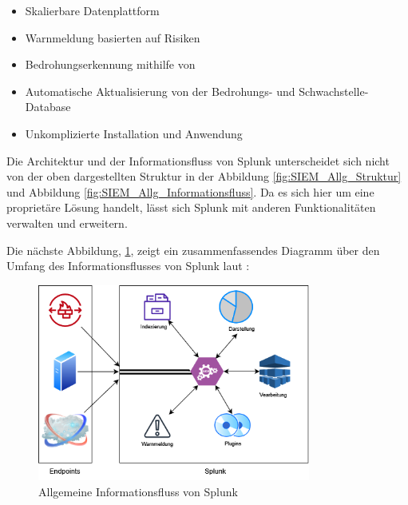 \begin{itemize}[noitemsep]
   \item Skalierbare Datenplattform
   \item Warnmeldung basierten auf Risiken
   \item Bedrohungserkennung mithilfe von 
   \item Automatische Aktualisierung von der Bedrohungs- und Schwachstelle-Database
   \item Unkomplizierte Installation und Anwendung
\end{itemize}

Die Architektur und der Informationsfluss von Splunk unterscheidet sich nicht von der oben dargestellten Struktur in der Abbildung \ref{fig:SIEM_Allg_Struktur} und Abbildung \ref{fig:SIEM_Allg_Informationsfluss}. Da es sich hier um eine proprietäre Lösung handelt, lässt sich Splunk mit anderen Funktionalitäten verwalten und erweitern.

Die nächste Abbildung, \ref{fig:Allgemein_Splunk}, zeigt ein zusammenfassendes Diagramm über den Umfang des Informationsflusses von Splunk laut \cite{Splunk_platform}:


\begin{figure}[H]
   \centering
   \includegraphics[width=0.8\textwidth]{assets/Splunk.drawio.png}
   \caption[Allgemeine Informationsfluss von Splunk]
   {Allgemeine Informationsfluss von Splunk}
   \label{fig:Allgemein_Splunk}
   \centering
\end{figure}

